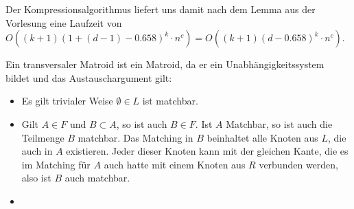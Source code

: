 Der Kompressionsalgorithmus liefert uns damit nach dem Lemma aus der Vorlesung eine Laufzeit von $O((k+1)(1+(d-1)-0.658)^k \cdot n^c) = O((k+1)(d-0.658)^k \cdot n^c)$.


\how



Ein transversaler Matroid ist ein Matroid, da er ein Unabhängigkeitssystem bildet und das Austauschargument gilt:

\begin{itemize}
\item Es gilt trivialer Weise $\emptyset \in L$ ist matchbar.

\item Gilt $A \in F$ und $B \subset A$, so ist auch $B \in F$. Ist $A$ Matchbar, so ist auch die Teilmenge $B$ matchbar. Das Matching in $B$ beinhaltet alle Knoten aus $L$, die auch in $A$ existieren. Jeder dieser Knoten kann mit der gleichen Kante, die es im Matching für $A$ auch hatte mit einem Knoten aus $R$ verbunden werden, also ist $B$ auch matchbar.

\item 
\end{itemize}

\subexercise
\subexercise




